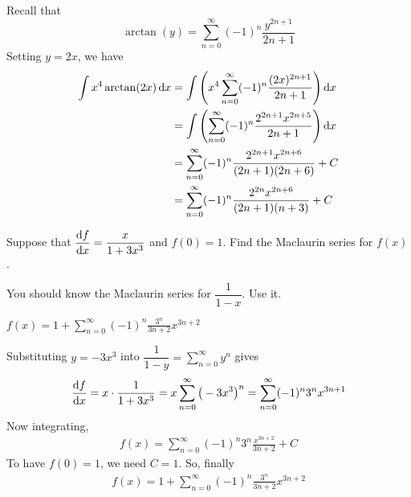 \begin{solution}
Recall that
\begin{equation*}
\arctan(y) = \sum_{n=0}^\infty(-1)^n\frac{y^{2n+1}}{2n+1}
\end{equation*}
Setting $y=2x$, we have
\begin{align*}
\int x^4\arctan(2x) \,\mathrm{d}x&=
\int\left( x^4\sum_{n=0}^\infty (-1)^n\frac{(2x)^{2n+1}}{2n+1} \right)\mathrm{d}x
\\&=
\int\left( \sum_{n=0}^\infty (-1)^n\frac{2^{2n+1}x^{2n+5}}{2n+1} \right)\mathrm{d}x
\\
&=
\sum_{n=0}^\infty (-1)^n\frac{2^{2n+1} x^{2n+6}}{(2n+1)(2n+6)} +C\\
&=\sum_{n=0}^\infty (-1)^n\frac{2^{2n} x^{2n+6}}{(2n+1)(n+3)} +C
\end{align*}
\end{solution}


\begin{Mquestion}[M105 2015A]\label{prob_s3.6modify2}
Suppose that $\displaystyle\diff{f}{x}=\frac{x}{1+3x^3}$ and $f(0)=1$.
Find the Maclaurin series for $f(x)$.
\end{Mquestion}

\begin{hint}
You should know the Maclaurin series for $\dfrac{1}{1-x}$. Use it.
\end{hint}

\begin{answer}
$f(x)  = 1+ \displaystyle\sum\limits_{n=0}^\infty (-1)^n  \frac{3^n }{3n+2} x^{3n+2}$
\end{answer}

\begin{solution}
Substituting $y=-3x^3$ into $\dfrac{1}{1-y} = \sum\limits_{n=0}^\infty y^n$
gives
\begin{align*}
\diff{f}{x} = x\cdot\frac{1}{1+3x^3}
=x\sum_{n=0}^\infty {\big(-3x^3\big)}^n
=\sum_{n=0}^\infty (-1)^n 3^n x^{3n+1}
\end{align*}
Now integrating,
\begin{align*}
f(x)  = \sum_{n=0}^\infty (-1)^n 3^n \frac{x^{3n+2}}{3n+2} +C
\end{align*}
To have $f(0)=1$, we need $C=1$. So, finally
\begin{align*}
f(x)  = 1+ \sum_{n=0}^\infty (-1)^n  \frac{3^n }{3n+2} x^{3n+2}
\end{align*}
\end{solution}


